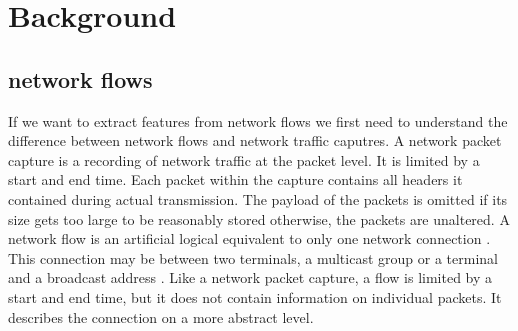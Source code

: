 \documentclass[
	ngerman,
	ruledheaders=section,%
	class=report,%
	thesis={type=bachelor},%
	accentcolor=9c,%
	custommargins=true,%
	marginpar=false,%
	parskip=half-,%
	fontsize=11pt,%
]{tudapub}
\begin{document}
\chapter{Background}


%
%

\section{network flows}

If we want to extract features from network flows
we first need to understand the difference between network flows and network traffic caputres.
A network packet capture is a recording of network traffic at the packet level.
It is limited by a start and end time.
Each packet within the capture contains all headers it contained during actual transmission.
The payload of the packets is omitted if its size gets too large to be reasonably stored otherwise, the packets are unaltered.
A network flow is an artificial logical equivalent to only one network connection \cite{brownleeTrafficFlowMeasurement}.
This connection may be between two terminals, a multicast group or a terminal and a broadcast address \cite{rajahalmeIPv6FlowLabel}.
Like a network packet capture, a flow is limited by a start and end time,
but it does not contain information on individual packets.
It describes the connection on a more abstract level.
\end{document}
